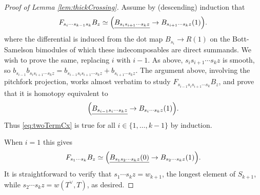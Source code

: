 \begin{proof}[Proof of Lemma \ref{lem:thickCrossing}]
Assume by (descending) induction that
\begin{equation}\label{eq:twoTermCx}
F_{s_i\cdots s_{k-1}s_k}B_z\simeq \Big(\underline{B_{s_is_{i+1}\cdots s_k z}} \rightarrow B_{s_{i+1}\cdots s_k z}(1)\Big).
\end{equation}
where the differential is induced from the dot map $B_{s_i}\rightarrow R(1)$ on the Bott-Samelson bimodules of which these indecomposables are direct summands. We wish to prove the same, replacing $i$ with $i-1$. As above, ${s_is_{i+1}\cdots s_k z}$ is smooth, so $b_{s_{i-1}} b_{s_is_{i+1}\cdots s_k z} = b_{s_{i-1}s_is_{i+1}\cdots s_k z} + b_{s_{i+1}\cdots s_k z}$.  The argument above, involving the pitchfork projection, works almost verbatim to study $F_{s_{i-1}s_is_{i+1}\cdots s_k}B_z$, and prove that it is homotopy equivalent to 
\[ \Big(\underline{B_{s_{i-1}s_i\cdots s_k z}} \rightarrow B_{s_{i}\cdots s_k z}(1)\Big).\]
Thus \eqref{eq:twoTermCx} is true for all $i\in\{1,\ldots,k-1\}$ by induction.

When $i=1$ this gives
\[
F_{s_1\cdots s_k}B_z \simeq \Big( \underline{B_{s_1s_2\cdots s_k z}(0)} \rightarrow B_{s_2\cdots s_k z}(1) \Big).
\]
It is straightforward to verify that $s_1 \cdots s_k z = w_{k+1}$, the longest element of $S_{k+1}$, while $s_2 \cdots s_k z = w(T^\vee,T)$, as desired.
\end{proof}














%
%

